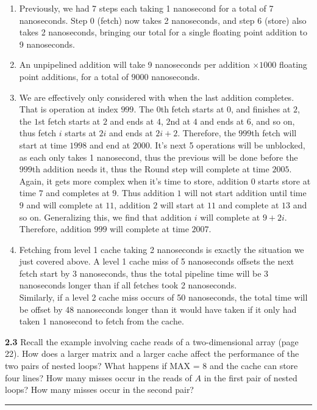 \documentclass[12pt]{jhwhw}
\begin{document}
	\begin{addmargin}[1em]{}
		\begin{enumerate}
			\item
				Previously, we had 7 steps each taking 1 nanosecond for a total of 7
				nanoseconds. Step 0 (fetch) now takes 2 nanoseconds, and 
				step 6 (store) also takes 2 nanoseconds, bringing our total for
				a single floating point addition to 9 nanoseconds.
			\item
				An unpipelined addition will take 9 nanoseconds per addition $\times 1000$ 
				floating point additions, for a total of $9000$ nanoseconds.
			\item
				We are effectively only considered with when the last addition completes. That
				is operation at index $999$. The $0$th fetch starts at $0$, and finishes at $2$,
				the $1$st fetch starts at $2$ and ends at $4$, $2$nd at $4$ and ends at 
				$6$, and so on,
				thus fetch $i$ starts at $2i$ and ends at $2i+2$. Therefore, the $999$th fetch
				will start at time $1998$ and end at $2000$. 
				It's next 5 operations will be unblocked, as each 
				only takes 1 nanosecond, thus the previous will be done before the $999$th 
				addition needs it, thus the Round step will complete at time $2005$.
				Again, it gets more complex when it's time to store, addition $0$ starts
				store at time $7$ and completes at $9$. Thus addition $1$ will not start
				addition until time $9$ and will complete at $11$, addition $2$ will
				start at $11$ and complete at $13$ and so on. Generalizing this,
				we find that addition $i$ will complete at $9 + 2i$. Therefore,
				addition $999$ will complete at time $2007$.
				\clearpage
			\item
				Fetching from level 1 cache taking 2 nanoseconds is exactly the situation
				we just covered above. A level 1 cache miss of 5 nanoseconds offsets the next
				fetch start by 3 nanoseconds, thus the total pipeline time will be 3 nanoseconds
				longer than if all fetches took 2 nanoseconds. \\
				Similarly, if a level 2 cache miss occurs of 50 nanoseconds, the total
				time will be offset by 48 nanoseconds longer than it would have taken if
				it only had taken 1 nanosecond to fetch from the cache.
		\end{enumerate}
	\end{addmargin}

\bigbreak
\textbf{2.3}
	Recall the example involving cache reads of a two-dimensional array (page 22).
	How does a larger matrix and a larger cache affect the performance of 
	the two pairs of nested loops? What happens if MAX = 8 and the cache
	can store four lines? How many misses occur in the reads of $A$ in the first pair
	of nested loops? How many misses occur in the second pair?
\textcolor[RGB]{240,240,240}{\rule{\textwidth}{0.5pt}}\bigbreak
\end{document}

